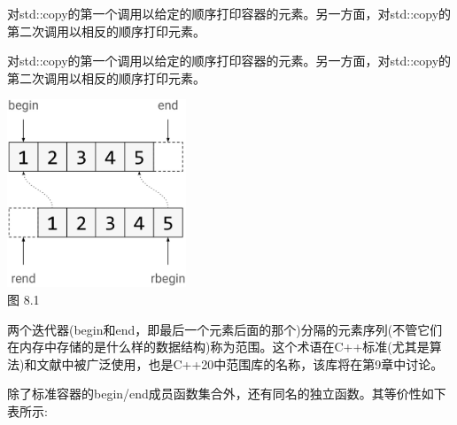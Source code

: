 对std::copy的第一个调用以给定的顺序打印容器的元素。另一方面，对std::copy的第二次调用以相反的顺序打印元素。

对std::copy的第一个调用以给定的顺序打印容器的元素。另一方面，对std::copy的第二次调用以相反的顺序打印元素。

\begin{center}
\includegraphics[width=0.4\textwidth]{content/3/chapter8/images/1.png}\\
图 8.1
\end{center}

两个迭代器(begin和end，即最后一个元素后面的那个)分隔的元素序列(不管它们在内存中存储的是什么样的数据结构)称为范围。这个术语在C++标准(尤其是算法)和文献中被广泛使用，也是C++20中范围库的名称，该库将在第9章中讨论。

除了标准容器的begin/end成员函数集合外，还有同名的独立函数。其等价性如下表所示:

